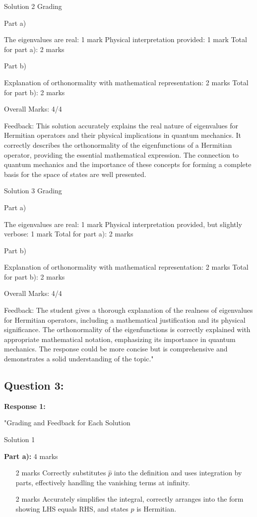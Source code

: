 \documentclass[a4paper,11pt]{article}
\begin{document}
Solution 2 Grading

Part a)

The eigenvalues are real: 1 mark
Physical interpretation provided: 1 mark
Total for part a): 2 marks

Part b)

Explanation of orthonormality with mathematical representation: 2 marks
Total for part b): 2 marks

Overall Marks: 4/4

Feedback: This solution accurately explains the real nature of eigenvalues for Hermitian operators and their physical implications in quantum mechanics. It correctly describes the orthonormality of the eigenfunctions of a Hermitian operator, providing the essential mathematical expression. The connection to quantum mechanics and the importance of these concepts for forming a complete basis for the space of states are well presented.

Solution 3 Grading

Part a)

The eigenvalues are real: 1 mark
Physical interpretation provided, but slightly verbose: 1 mark
Total for part a): 2 marks

Part b)

Explanation of orthonormality with mathematical representation: 2 marks
Total for part b): 2 marks

Overall Marks: 4/4

Feedback: The student gives a thorough explanation of the realness of eigenvalues for Hermitian operators, including a mathematical justification and its physical significance. The orthonormality of the eigenfunctions is correctly explained with appropriate mathematical notation, emphasizing its importance in quantum mechanics. The response could be more concise but is comprehensive and demonstrates a solid understanding of the topic."

\subsection*{Question 3:}

\textbf{Response 1:}

"Grading and Feedback for Each Solution

Solution 1

\textbf{Part a):} 4 marks
\begin{itemize}
    \item [2 marks] Correctly substitutes \( \hat{p} \) into the definition and uses integration by parts, effectively handling the vanishing terms at infinity.
    \item [2 marks] Accurately simplifies the integral, correctly arranges into the form showing LHS equals RHS, and states \( \hat{p} \) is Hermitian.
\end{itemize}
\end{document}
